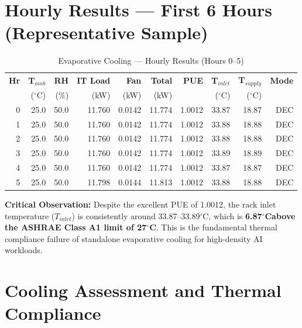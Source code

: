 \documentclass[12pt,a4paper]{report}
\newcommand{\degC}{$^{\circ}$C}
\begin{document}
\section{Hourly Results --- First 6 Hours (Representative Sample)}

\begin{table}[H]
\centering
\caption{Evaporative Cooling --- Hourly Results (Hours 0--5)}
\label{tab:evap_hourly}
\renewcommand{\arraystretch}{1.2}
\scriptsize
\begin{tabular}{rrrrrrrrrr}
\toprule
\textbf{Hr} & \textbf{T$_{amb}$} & \textbf{RH} & \textbf{IT Load} & \textbf{Fan} & \textbf{Total} & \textbf{PUE} & \textbf{T$_{inlet}$} & \textbf{T$_{supply}$} & \textbf{Mode} \\
 & (\degC) & (\%) & (kW) & (kW) & (kW) & & (\degC) & (\degC) & \\
\midrule
0 & 25.0 & 50.0 & 11.760 & 0.0142 & 11.774 & 1.0012 & 33.87 & 18.87 & DEC \\
1 & 25.0 & 50.0 & 11.760 & 0.0142 & 11.774 & 1.0012 & 33.88 & 18.88 & DEC \\
2 & 25.0 & 50.0 & 11.760 & 0.0142 & 11.774 & 1.0012 & 33.88 & 18.88 & DEC \\
3 & 25.0 & 50.0 & 11.760 & 0.0142 & 11.774 & 1.0012 & 33.89 & 18.89 & DEC \\
4 & 25.0 & 50.0 & 11.760 & 0.0142 & 11.774 & 1.0012 & 33.87 & 18.87 & DEC \\
5 & 25.0 & 50.0 & 11.798 & 0.0144 & 11.813 & 1.0012 & 33.88 & 18.88 & DEC \\
\bottomrule
\end{tabular}
\end{table}

\noindent\textbf{Critical Observation:} Despite the excellent PUE of 1.0012, the rack inlet temperature
($T_{inlet}$) is consistently around 33.87--33.89\degC, which is \textbf{6.87\degC above the ASHRAE
Class A1 limit of 27\degC}. This is the fundamental thermal compliance failure of standalone evaporative
cooling for high-density AI workloads.

\section{Cooling Assessment and Thermal Compliance}
\end{document}
